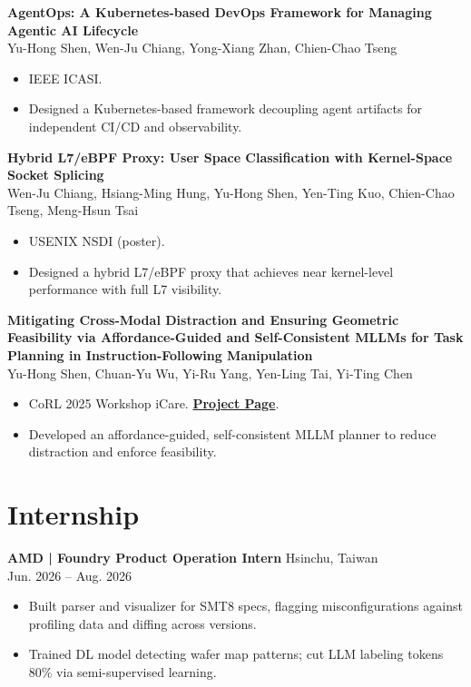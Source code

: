 \documentclass[10pt,a4paper]{article}
\begin{document}
\textbf{AgentOps: A Kubernetes-based DevOps Framework for Managing Agentic AI Lifecycle} \\
Yu-Hong Shen, Wen-Ju Chiang, Yong-Xiang Zhan, Chien-Chao Tseng
\begin{itemize}
  \item IEEE ICASI.
  \item Designed a Kubernetes-based framework decoupling agent artifacts for independent CI/CD and observability.
\end{itemize}

\textbf{Hybrid L7/eBPF Proxy: User Space Classification with Kernel-Space Socket Splicing} \\
Wen-Ju Chiang, Hsiang-Ming Hung, Yu-Hong Shen, Yen-Ting Kuo, Chien-Chao Tseng, Meng-Hsun Tsai
\begin{itemize}
  \item USENIX NSDI (poster).
  \item Designed a hybrid L7/eBPF proxy that achieves near kernel-level performance with full L7 visibility.
\end{itemize}

\textbf{Mitigating Cross-Modal Distraction and Ensuring Geometric Feasibility via Affordance-Guided and Self-Consistent MLLMs for Task Planning in Instruction-Following Manipulation} \\
Yu-Hong Shen, Chuan-Yu Wu, Yi-Ru Yang, Yen-Ling Tai, Yi-Ting Chen
\begin{itemize}
  \item CoRL 2025 Workshop iCare. \href{https://hcis-lab.github.io/Affordance-Guided-Self-Consistent-MLLM/}{\textbf{Project Page}}.
  \item Developed an affordance-guided, self-consistent MLLM planner to reduce distraction and enforce feasibility.
\end{itemize}

\section*{Internship}

\textbf{AMD | Foundry Product Operation Intern} \hfill Hsinchu, Taiwan \\
\hfill Jun. 2026 -- Aug. 2026
\begin{itemize}
  \item Built parser and visualizer for SMT8 specs, flagging misconfigurations against profiling data and diffing across versions.
  \item Trained DL model detecting wafer map patterns; cut LLM labeling tokens 80\% via semi-supervised learning.
\end{itemize}
\end{document}
